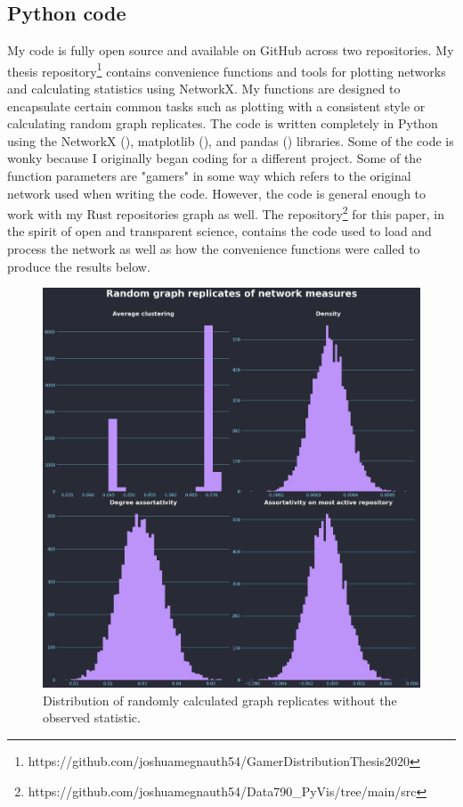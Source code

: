 \documentclass[12pt, a4paper]{article}
\begin{document}
\subsection{Python code}
My code is fully open source and available on GitHub across two repositories. My thesis repository\footnote{https://github.com/joshuamegnauth54/GamerDistributionThesis2020} contains convenience functions and tools for plotting networks and calculating statistics using NetworkX. My functions are designed to encapsulate certain common tasks such as plotting with a consistent style or calculating random graph replicates. The code is written completely in Python using the NetworkX (\cite{networkx}), matplotlib (\cite{Hunter:2007}), and pandas (\cite{reback2020pandas}) libraries. Some of the code is wonky because I originally began coding for a different project. Some of the function parameters are "gamers" in some way which refers to the original network used when writing the code. However, the code is general enough to work with my Rust repositories graph as well. The repository\footnote{https://github.com/joshuamegnauth54/Data790\_PyVis/tree/main/src} for this paper, in the spirit of open and transparent science, contains the code used to load and process the network as well as how the convenience functions were called to produce the results below.

\begin{figure}[ht!]
    \includegraphics[width=\linewidth]{metrics_dist.png}
    \caption{Distribution of randomly calculated graph replicates without the observed statistic.}
    \label{fig:metricsdist}
\end{figure}
\end{document}
